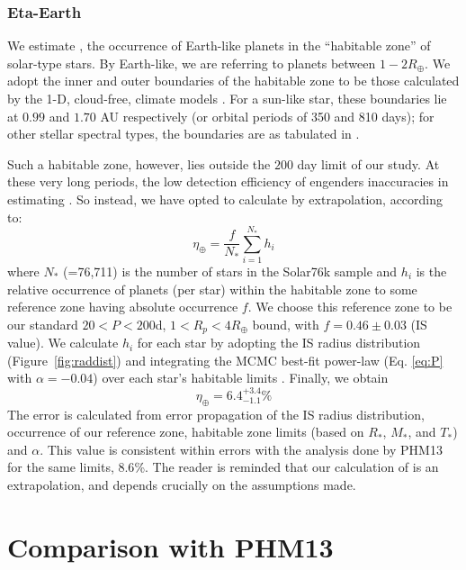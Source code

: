 \subsubsection{Eta-Earth}

We estimate \ee{}, the occurrence of Earth-like planets in the
``habitable zone'' of solar-type stars. By Earth-like, we are
referring to planets between $1-2 R_\oplus$.  We adopt the inner
and outer boundaries of the habitable zone to be those calculated by
the 1-D, cloud-free, climate models \citep{Kasting,Kopparapu2013a}.
For a sun-like star, these boundaries lie at $0.99$ and $1.70$ AU respectively
(or orbital periods of 350 and 810 days); for other stellar spectral
types, the boundaries are as tabulated in \citet{Kopparapu2013a}.

Such a habitable zone, however, lies outside the $200$ day limit of
our study. At these very long periods, the low detection efficiency of
\kep{} engenders inaccuracies in estimating \ee{}. So instead, we have
opted to calculate \ee{} by extrapolation, according to:
\begin{equation}
\eta_{\oplus} = \frac{f}{N_*}\sum\limits_{i=1}^{N_*} h_i
\end{equation}
where $N_*$ (=76,711) is the number of stars in the Solar76k
sample and $h_i$ is the relative occurrence of planets (per star)
within the habitable zone to some reference zone having absolute
occurrence $f$.  We choose this reference zone to be our standard $20 < P <
200$d, $1 < R_p < 4 R_\oplus$ bound, with $f=0.46 \pm 0.03$ (IS
value). We calculate $h_i$ for each star by adopting the IS
radius distribution (Figure~\ref{fig:raddist}) and integrating
the MCMC best-fit power-law (Eq. \ref{eq:P} with $\alpha=-0.04$) over
each star's habitable limits \citep{Kopparapu2013a}.  Finally, we obtain
\begin{equation}
\eta_{\oplus} = 6.4^{+3.4}_{-1.1} \%
\end{equation}
The error is calculated from error propagation of the IS radius
distribution, occurrence of our reference zone, habitable zone limits 
(based on $R_*$, $M_*$, and $T_*$) and $\alpha$.  
This value is consistent within errors with
the analysis done by PHM13 for the same \citet{Kopparapu2013a} limits,
$8.6$\%. The reader is reminded that our calculation of \ee{} is an
extrapolation, and depends crucially on the assumptions made.

\section{Comparison with PHM13}
\label{sec:petcomp}

